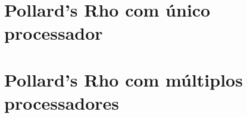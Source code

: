 \documentclass{beamer}
\begin{document}
%
%

\section{Pollard's Rho com único processador}
\begin{frame}

\end{frame}

%
%

\section{Pollard's Rho com múltiplos processadores}
\begin{frame}

\end{frame}

%
%

\end{document}
